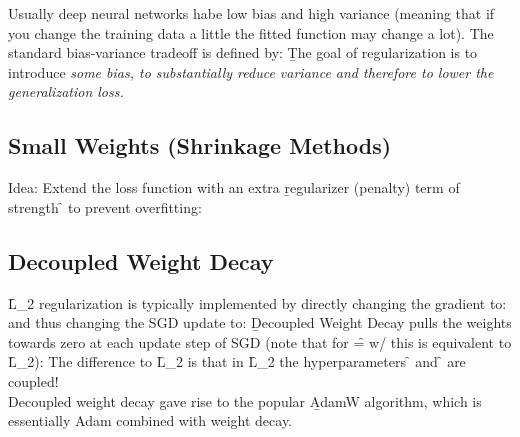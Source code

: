 Usually deep neural networks habe low bias and high variance (meaning that if you change the training data a little the fitted function may change a lot). The standard bias-variance tradeoff is defined by:
\b{The goal of regularization is to introduce \it{some} bias, to substantially reduce variance and therefore to lower the generalization loss.}


\subsection{Small Weights (Shrinkage Methods)}
Idea: Extend the loss function with an extra \b{regularizer} (penalty) term of strength \f{\lambda} to prevent overfitting:

\subsection{Decoupled Weight Decay}
\f{L_2} regularization is typically implemented by directly changing the gradient to:
and thus changing the SGD update to:
\b{Decoupled Weight Decay} pulls the weights towards zero at each update step of SGD (note that for \f{\lambda = w/\alpha} this is equivalent to \f{L_2}):
The difference to \f{L_2} is that in \f{L_2} the hyperparameters \f{\lambda} and \f{\alpha} are coupled!\\
Decoupled weight decay gave rise to the popular \b{AdamW} algorithm, which is essentially Adam combined with weight decay.

